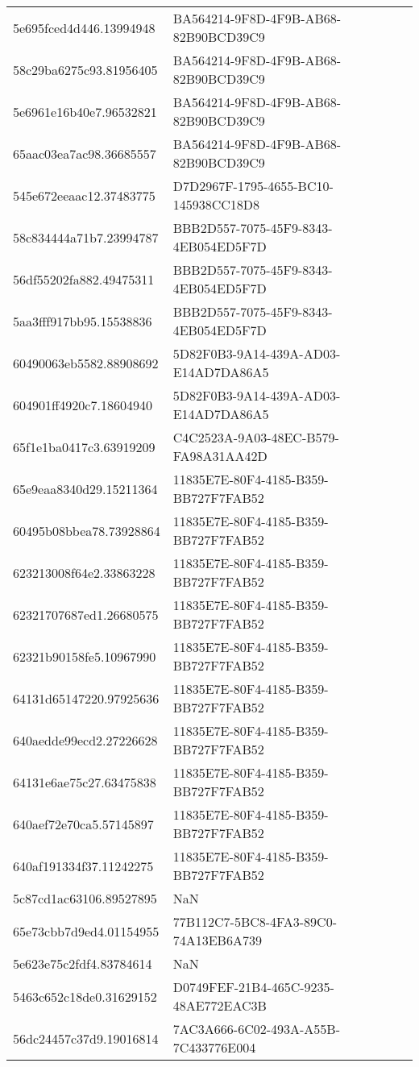 \begin{tabular}{ll}
5e695fced4d446.13994948 & BA564214-9F8D-4F9B-AB68-82B90BCD39C9 \\
58c29ba6275c93.81956405 & BA564214-9F8D-4F9B-AB68-82B90BCD39C9 \\
5e6961e16b40e7.96532821 & BA564214-9F8D-4F9B-AB68-82B90BCD39C9 \\
65aac03ea7ac98.36685557 & BA564214-9F8D-4F9B-AB68-82B90BCD39C9 \\
545e672eeaac12.37483775 & D7D2967F-1795-4655-BC10-145938CC18D8 \\
58c834444a71b7.23994787 & BBB2D557-7075-45F9-8343-4EB054ED5F7D \\
56df55202fa882.49475311 & BBB2D557-7075-45F9-8343-4EB054ED5F7D \\
5aa3fff917bb95.15538836 & BBB2D557-7075-45F9-8343-4EB054ED5F7D \\
60490063eb5582.88908692 & 5D82F0B3-9A14-439A-AD03-E14AD7DA86A5 \\
604901ff4920c7.18604940 & 5D82F0B3-9A14-439A-AD03-E14AD7DA86A5 \\
65f1e1ba0417c3.63919209 & C4C2523A-9A03-48EC-B579-FA98A31AA42D \\
65e9eaa8340d29.15211364 & 11835E7E-80F4-4185-B359-BB727F7FAB52 \\
60495b08bbea78.73928864 & 11835E7E-80F4-4185-B359-BB727F7FAB52 \\
623213008f64e2.33863228 & 11835E7E-80F4-4185-B359-BB727F7FAB52 \\
62321707687ed1.26680575 & 11835E7E-80F4-4185-B359-BB727F7FAB52 \\
62321b90158fe5.10967990 & 11835E7E-80F4-4185-B359-BB727F7FAB52 \\
64131d65147220.97925636 & 11835E7E-80F4-4185-B359-BB727F7FAB52 \\
640aedde99ecd2.27226628 & 11835E7E-80F4-4185-B359-BB727F7FAB52 \\
64131e6ae75c27.63475838 & 11835E7E-80F4-4185-B359-BB727F7FAB52 \\
640aef72e70ca5.57145897 & 11835E7E-80F4-4185-B359-BB727F7FAB52 \\
640af191334f37.11242275 & 11835E7E-80F4-4185-B359-BB727F7FAB52 \\
5c87cd1ac63106.89527895 & NaN \\
65e73cbb7d9ed4.01154955 & 77B112C7-5BC8-4FA3-89C0-74A13EB6A739 \\
5e623e75c2fdf4.83784614 & NaN \\
5463c652c18de0.31629152 & D0749FEF-21B4-465C-9235-48AE772EAC3B \\
56dc24457c37d9.19016814 & 7AC3A666-6C02-493A-A55B-7C433776E004 \\

\end{tabular}
